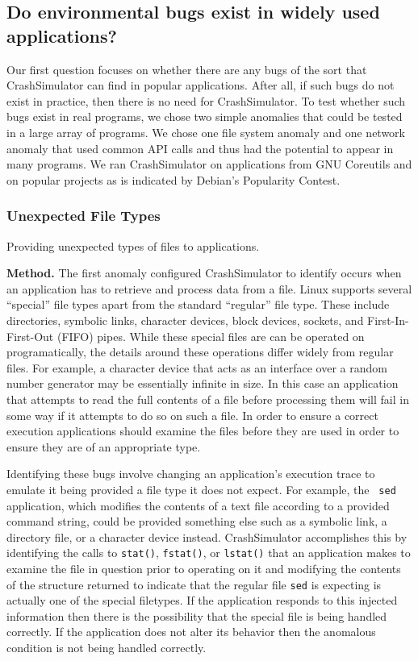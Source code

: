 \subsection{Do environmental bugs  exist in widely used applications?}


Our first question focuses on whether there are any bugs of the sort that
CrashSimulator can find in popular applications.  After all, if such bugs
do not exist in practice, then there is no need for CrashSimulator.
To test whether such bugs exist in real programs, we 
chose two simple anomalies that could be tested in a large
array of programs.  We chose one file system anomaly and one network anomaly 
that used common API calls and thus had the potential to appear in
many programs.  We ran CrashSimulator on applications from GNU Coreutils and
on popular projects as is indicated by Debian's Popularity Contest.

\subsubsection{Unexpected File Types} Providing unexpected types of files to
applications.

{\bf Method.}
The first anomaly configured CrashSimulator to identify occurs when an
application has to retrieve and process data from a file.  Linux supports
several ``special'' file types apart from the standard ``regular'' file type.
These include directories, symbolic links, character devices, block devices,
sockets, and First-In-First-Out (FIFO) pipes.  While these special files are can
be operated on programatically, the details around these operations differ
widely from regular files.  For example, a character device that acts as an
interface over a random number generator may be essentially infinite in size.
In this case an application that attempts to read the full contents of a file
before processing them will fail in some way if it attempts to do so on such a
file.  In order to ensure a correct execution applications should examine the
files before they are used in order to ensure they are of an appropriate type.

Identifying these bugs involve changing an application's execution trace to
emulate it being provided a file type it does not expect.  For example, the {\tt
  sed} application, which modifies the contents of a text file according to a
provided command string, could be provided something else such as a symbolic
link, a directory file, or a character device instead.  CrashSimulator
accomplishes this by identifying the calls to {\tt stat()}, {\tt fstat()}, or
{\tt lstat()}  that an application makes to examine the file in question prior
to operating on it and modifying the contents of the structure returned to
indicate that the regular file {\tt sed} is expecting is actually one of the
special filetypes.  If the application responds to this injected information
then there is the possibility that the special file is being handled correctly.
If the application does not alter its behavior then the anomalous condition is
not being handled correctly.

